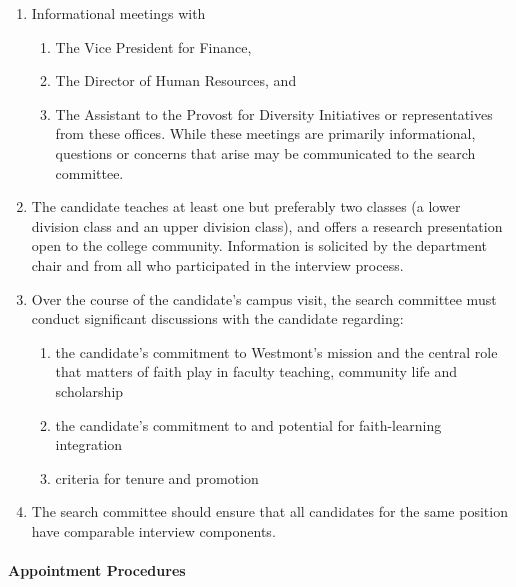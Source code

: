 \documentclass[letterpaper, 11pt]{article}
\begin{document}
\begin{enumerate}[label=\alph*)]
{\begin{enumerate}[label=(\arabic*)]
{\begin{enumerate}[label=$\bullet$]
									\item{and students}
								\end{enumerate}
							}
							\item{Informational meetings with
								\begin{enumerate}[label=$\bullet$]
									\item{The Vice President for Finance,}
									\item{The Director of Human Resources, and}
									\item{The Assistant to the Provost for Diversity Initiatives or representatives from these offices.  While these meetings are primarily informational, questions or concerns that arise may be communicated to the search committee.}
								\end{enumerate}
							}
							\item{The candidate teaches at least one but preferably two classes (a lower division class and an upper division class), and offers a research presentation open to the college community.  Information is solicited by the department chair and from all who participated in the interview process.}
							\item{Over the course of the candidate's campus visit, the search committee must conduct significant discussions with the candidate regarding:
								\begin{enumerate}[label=$\bullet$]
									\item{the candidate's commitment to Westmont's mission and the central role that matters of faith play in faculty teaching, community life and scholarship}
									\item{the candidate's commitment to and potential for faith-learning integration}
									\item{criteria for tenure and promotion}
								\end{enumerate}
							}
							\item{The search committee should ensure that all candidates for the same position have comparable interview components.}
						\end{enumerate}
					}
				\end{enumerate}
			\paragraph{Appointment Procedures}
\end{document}

